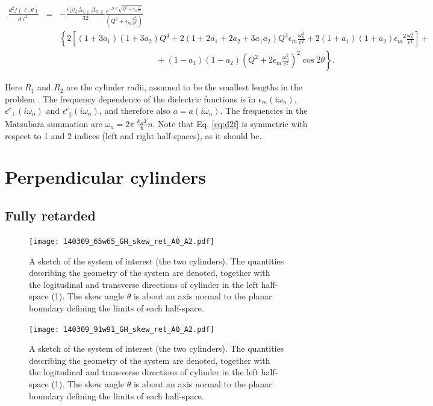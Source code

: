 \documentclass[onecolumn,letterpaper,amsmath,amssymb,floatfix,aps,superscriptaddress]{revtex4}
\begin{document}
\begin{widetext}
\begin{eqnarray}
\frac{d^{2}f(\ell,\theta)}{d\ell^{2}} &=& - \frac{v_1 v_2 \Delta_{1,\parallel} \Delta_{2,\parallel}}{32} 
\frac{e^{-2 \ell \sqrt{Q^{2} + \epsilon_m \frac{\omega_n^{2}}{c^{2}}}}}{(Q^{2} + \epsilon_m \frac{\omega_n^{2}}{c^{2}})} \nonumber \\
& &
\left\{ 2 \left[ (1+3a_1)(1+3a_2) Q^{4} + 2 (1+2a_1+2a_2+3a_1a_2) Q^{2} \epsilon_m \frac{\omega_n^{2}}{c^{2}} + 2(1+a_1)(1+a_2) {\epsilon_m}^{2} \frac{\omega_n^{4}}{c^{4}}\right] \right. + \nonumber\\
& & \left. ~~~~~~~~~~~~~~~~~~~~~~~~~~~~~~~~~~~~~~~~~~~~~~~~~~~~ + (1-a_1)(1-a_2)\left( Q^{2} + 2 \epsilon_m \frac{\omega_n^{2}}{c^{2}} \right)^2 \cos 2\theta \right \}.
\label{eq:d2f}
\end{eqnarray}
\end{widetext}
Here $R_1$ and $R_2$ are the cylinder radii, assumed to be the smallest lengths in the problem \cite{Barash89}. The frequency dependence of the dielectric functions is in 
$\epsilon_m(i \omega_n)$, ${\epsilon^{c}}_{\perp}(i \omega_n)$ and ${\epsilon^{c}}_{\parallel}(i \omega_n)$, and therefore also $a = a(i \omega_n)$. The frequencies 
in the Matsubara summation are $\omega_n = 2\pi~\frac{k_BT}{\hbar} n$. Note that Eq. \ref{eq:d2f} is symmetric with respect to 1 and 2 indices (left and right 
half-spaces), as it should be.

\section{Perpendicular cylinders}

\subsection{Fully retarded}

\begin{figure}
\centerline{\texttt{[image: 140309\_65w65\_GH\_skew\_ret\_A0\_A2.pdf]}}
\caption{A sketch of the system of interest (the two cylinders). The quantities describing the geometry of the system are 
denoted, together with the logitudinal and transverse directions of cylinder in the left half-space (1). The skew angle $\theta$ is about an axis normal to the planar boundary defining the limits of each half-space.
}
\label{fig:sketch}
\end{figure}

\begin{figure}
\centerline{\texttt{[image: 140309\_91w91\_GH\_skew\_ret\_A0\_A2.pdf]}}
\caption{A sketch of the system of interest (the two cylinders). The quantities describing the geometry of the system are 
denoted, together with the logitudinal and transverse directions of cylinder in the left half-space (1). The skew angle $\theta$ is about an axis normal to the planar boundary defining the limits of each half-space.
}
\label{fig:sketch}
\end{figure}
\end{document}
